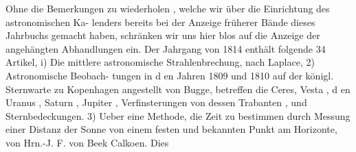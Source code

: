 \documentclass[12pt,a4paper]{article}
\begin{document}
Ohne die Bemerkungen zu wiederholen , welche wir über die Einrichtung des astronomischen Ka-\newline
lenders bereits bei der Anzeige früherer Bände dieses Jahrbuchs gemacht haben, schränken wir uns hier\newline
blos auf die Anzeige der angehängten Abhandlungen ein. Der Jahrgang von 1814 enthält folgende 34\newline
Artikel, i) Die mittlere astronomische Strahlenbrechung, nach Laplace, 2) Astronomische Beobach-\newline
tungen in d en Jahren 1809 und 1810 auf der königl. Sternwarte zu Kopenhagen angestellt von Bugge,\newline
betreffen die Ceres, Vesta , d en Uranus , Saturn , Jupiter , Verfinsterungen von dessen Trabanten , und\newline
Sternbedeckungen. 3) Ueber eine Methode, die Zeit zu bestimmen durch Messung einer Distanz der\newline
Sonne von einem festen und bekannten Punkt am Horizonte, von Hrn.-J. F. von Beek Calkoen. Dies\newline
\end{document}
